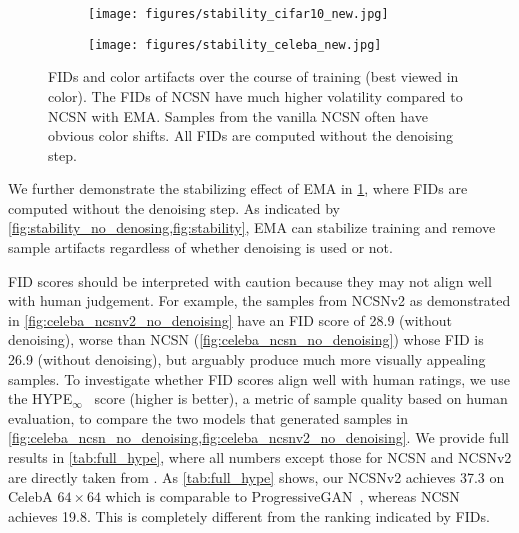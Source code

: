 \documentclass{article}
\begin{document}
\begin{figure}\centering
    \begin{subfigure}[b]{0.43\textwidth}
        \texttt{[image: figures/stability\_cifar10\_new.jpg]}
    \end{subfigure}
    \begin{subfigure}[b]{0.43\textwidth}
        \texttt{[image: figures/stability\_celeba\_new.jpg]}
    \end{subfigure}
    \caption{FIDs and color artifacts over the course of training (best viewed in color). The FIDs of NCSN have much higher volatility compared to NCSN with EMA. Samples from the vanilla NCSN often have obvious color shifts. All FIDs are computed without the denoising step.}
    \label{fig:stability_no_denosing}
\end{figure}

We further demonstrate the stabilizing effect of EMA in \cref{fig:stability_no_denosing}, where FIDs are computed without the denoising step. As indicated by \cref{fig:stability_no_denosing,fig:stability}, EMA can stabilize training and remove sample artifacts regardless of whether denoising is used or not.


FID scores should be interpreted with caution because they may not align well with human judgement. For example, the samples from NCSNv2 as demonstrated in \cref{fig:celeba_ncsnv2_no_denoising} have an FID score of 28.9 (without denoising), worse than NCSN (\cref{fig:celeba_ncsn_no_denoising}) whose FID is 26.9 (without denoising), but arguably produce much more visually appealing samples. To investigate whether FID scores align well with human ratings, we use the HYPE$_\infty$~\cite{zhou2019hype} score (higher is better), a metric of sample quality based on human evaluation, to compare the two models that generated samples in \cref{fig:celeba_ncsn_no_denoising,fig:celeba_ncsnv2_no_denoising}. We provide full results in \cref{tab:full_hype}, where all numbers except those for NCSN and NCSNv2 are directly taken from \cite{zhou2019hype}. As \cref{tab:full_hype} shows, our NCSNv2 achieves 37.3 on CelebA $64\times 64$ which is comparable to ProgressiveGAN~\cite{karras2017progressive}, whereas NCSN achieves 19.8. This is completely different from the ranking indicated by FIDs.
\end{document}
